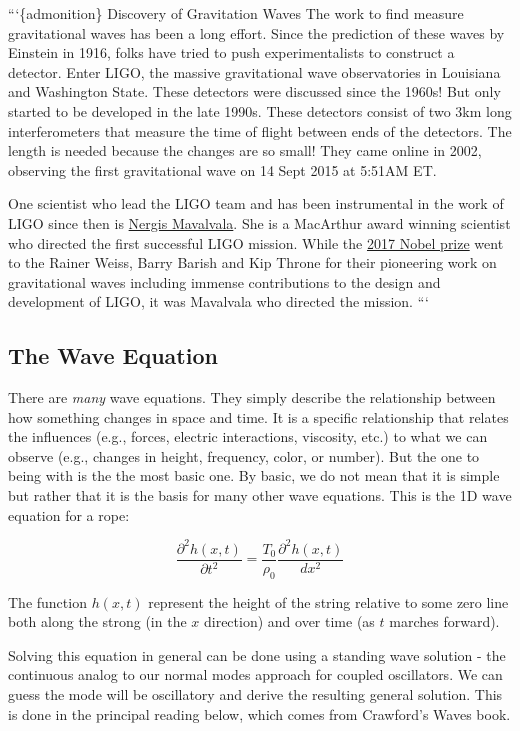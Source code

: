 ```\{admonition\} Discovery of Gravitation Waves The work to find
measure gravitational waves has been a long effort. Since the prediction
of these waves by Einstein in 1916, folks have tried to push
experimentalists to construct a detector. Enter LIGO, the massive
gravitational wave observatories in Louisiana and Washington State.
These detectors were discussed since the 1960s! But only started to be
developed in the late 1990s. These detectors consist of two 3km long
interferometers that measure the time of flight between ends of the
detectors. The length is needed because the changes are so small! They
came online in 2002, observing the first gravitational wave on 14 Sept
2015 at 5:51AM ET.

One scientist who lead the LIGO team and has been instrumental in the
work of LIGO since then is
\href{https://physics.mit.edu/faculty/nergis-mavalvala/}{Nergis
Mavalvala}. She is a MacArthur award winning scientist who directed the
first successful LIGO mission. While the
\href{https://www.nobelprize.org/prizes/physics/2017/press-release/}{2017
Nobel prize} went to the Rainer Weiss, Barry Barish and Kip Throne for
their pioneering work on gravitational waves including immense
contributions to the design and development of LIGO, it was Mavalvala
who directed the mission. ```

\subsection{The Wave Equation}\label{the-wave-equation}

There are \emph{many} wave equations. They simply describe the
relationship between how something changes in space and time. It is a
specific relationship that relates the influences (e.g., forces,
electric interactions, viscosity, etc.) to what we can observe (e.g.,
changes in height, frequency, color, or number). But the one to being
with is the the most basic one. By basic, we do not mean that it is
simple but rather that it is the basis for many other wave equations.
This is the 1D wave equation for a rope:

\[\dfrac{\partial^2 h(x,t)}{\partial t^2} = \dfrac{T_0}{\rho_0}\dfrac{\partial^2 h(x,t)}{dx^2}\]

The function \(h(x,t)\) represent the height of the string relative to
some zero line both along the strong (in the \(x\) direction) and over
time (as \(t\) marches forward).

Solving this equation in general can be done using a standing wave
solution - the continuous analog to our normal modes approach for
coupled oscillators. We can guess the mode will be oscillatory and
derive the resulting general solution. This is done in the principal
reading below, which comes from Crawford's Waves book.

